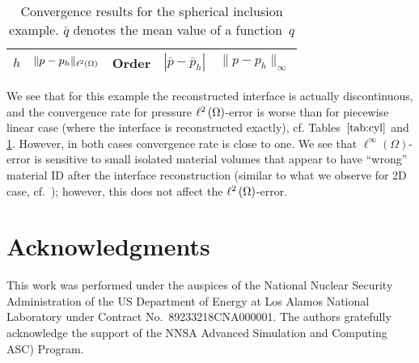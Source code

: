 \begin{table}[H]
	\centering\footnotesize
	\caption{Convergence results for the spherical inclusion example. $\bar q$ denotes the mean value of a function~$q$} 
	\label{tab:cube}
	\begin{subtable}{1.\linewidth}
		\centering
		\begin{tabular}[1.2]{|c||c|c||c||c|}
			\hline
			$h$ & $\| p - p_h \|_{{\ell^2\left({\Omega}\right)}}$ & Order & $| \bar p - \bar p_h |$ & $\| p - p_h \|_{\infty}$ \\ 
			\hline
			
		\end{tabular}
	\end{subtable}%
\end{table}

We see that for this example the reconstructed interface is actually discontinuous, and the convergence rate for pressure ${\ell^2\left({\Omega}\right)}$-error is worse than for piecewise linear case (where the interface is reconstructed exactly), cf. Tables~$\ref{tab:cyl}$ and \ref{tab:cube}. However, in both cases convergence rate is close to one. We see that $\ell^\infty(\Omega)$-error is sensitive to small isolated material volumes that appear to have ``wrong'' material ID after the interface reconstruction (similar to what we observe for 2D case, cf.~\cite[Section~4.3.1]{ZHILIAKOV2019333}); however, this does not affect the ${\ell^2\left({\Omega}\right)}$-error.

\section*{Acknowledgments}

This work was performed under the auspices of the National Nuclear Security Administration of the US Department of Energy at Los Alamos National Laboratory under Contract No.~89233218CNA000001. The authors gratefully acknowledge the support of the NNSA Advanced Simulation and Computing ASC) Program.






